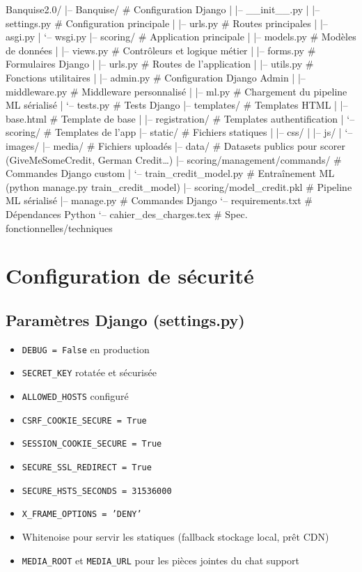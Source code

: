 \documentclass[12pt,a4paper]{report}
\begin{document}
\begin{CodeBlock}
Banquise2.0/
|-- Banquise/              # Configuration Django
|   |-- __init__.py
|   |-- settings.py        # Configuration principale
|   |-- urls.py            # Routes principales
|   |-- asgi.py
|   `-- wsgi.py
|-- scoring/               # Application principale
|   |-- models.py          # Modèles de données
|   |-- views.py           # Contrôleurs et logique métier
|   |-- forms.py           # Formulaires Django
|   |-- urls.py            # Routes de l'application
|   |-- utils.py           # Fonctions utilitaires
|   |-- admin.py           # Configuration Django Admin
|   |-- middleware.py      # Middleware personnalisé
|   |-- ml.py              # Chargement du pipeline ML sérialisé
|   `-- tests.py           # Tests Django
|-- templates/             # Templates HTML
|   |-- base.html          # Template de base
|   |-- registration/      # Templates authentification
|   `-- scoring/           # Templates de l'app
|-- static/                # Fichiers statiques
|   |-- css/
|   |-- js/
|   `-- images/
|-- media/                 # Fichiers uploadés
|-- data/                  # Datasets publics pour scorer (GiveMeSomeCredit, German Credit…)
|-- scoring/management/commands/  # Commandes Django custom
|   `-- train_credit_model.py     # Entraînement ML (python manage.py train_credit_model)
|-- scoring/model_credit.pkl      # Pipeline ML sérialisé
|-- manage.py              # Commandes Django
`-- requirements.txt       # Dépendances Python
`-- cahier_des_charges.tex  # Spec. fonctionnelles/techniques
\end{CodeBlock}

\section{Configuration de sécurité}

\subsection{Paramètres Django (settings.py)}
\begin{itemize}[leftmargin=1.5cm]
    \item \texttt{DEBUG = False} en production
    \item \texttt{SECRET\_KEY} rotatée et sécurisée
    \item \texttt{ALLOWED\_HOSTS} configuré
    \item \texttt{CSRF\_COOKIE\_SECURE = True}
    \item \texttt{SESSION\_COOKIE\_SECURE = True}
    \item \texttt{SECURE\_SSL\_REDIRECT = True}
    \item \texttt{SECURE\_HSTS\_SECONDS = 31536000}
    \item \texttt{X\_FRAME\_OPTIONS = 'DENY'}
    \item Whitenoise pour servir les statiques (fallback stockage local, prêt CDN)
    \item \texttt{MEDIA\_ROOT} et \texttt{MEDIA\_URL} pour les pièces jointes du chat support
\end{itemize}
\end{document}
